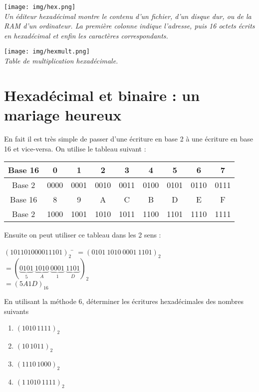 \documentclass[a4paper,12pt,french]{book}
\begin{document}
\begin{center}
\texttt{[image: img/hex.png]}\\
\textit{\small Un éditeur hexadécimal montre le contenu d'un fichier, d'un disque dur, ou de la RAM d'un ordinateur. La première colonne indique l'adresse, 
puis 16 octets écrits en hexadécimal et enfin les caractères correspondants.}
\end{center}

\begin{center}
\texttt{[image: img/hexmult.png]}\\
\textit{\small Table de multiplication hexadécimale.}
\end{center}
\section{Hexadécimal et binaire : un mariage heureux}
En fait il est très simple de passer d'une écriture en base 2 à une écriture en base 16 et vice-versa. On utilise le tableau suivant :
\begin{center}
\begin{tabular}{|c|c|c|c|c|c|c|c|c|}
\hline 
\rowcolor{orange@color!15}
Base 16 & 0 & 1 & 2 & 3 & 4 & 5 & 6 & 7 \\
\hline 
Base 2 & 0000 & 0001 & 0010 & 0011 & 0100 & 0101 & 0110 & 0111  \\ 
\hline 
\rowcolor{orange@color!15}
Base 16 & 8 & 9 & A & C & B & D & E & F \\ 
\hline
Base 2 & 1000 & 1001 & 1010 & 1011 & 1100 & 1101 & 1110 & 1111\\
\hline
\end{tabular} 
\end{center}
Ensuite on peut utiliser ce tableau dans les 2 sens :
\begin{methode}
\begin{tabbing}
	$(101101000011101)_2$	\=	$=(0101\ 1010\ 0001\ 1101)_2$\\
				\>	$=\left(\underbrace{0101}_5\ \underbrace{1010}_A\ \underbrace{0001}_1\ \underbrace{1101}_D\right)_2$\\
				\>	$=(5A1D)_{16}$
\end{tabbing}
\end{methode}
\begin{exercice}[]
	En utilisant la méthode 6,  déterminer les écritures hexadécimales des nombres suivants
		\begin{multicols}{2}
			\begin{enumerate}[\bfseries 1.]
				\item 	$(1010\,1111)_2$
				\item 	$(10\,1011)_2$
				\item 	$(1110\,1000)_2$
				\item 	$(1\,1010\,1111)_2$
			\end{enumerate}
		\end{multicols}
\end{exercice}
\end{document}
